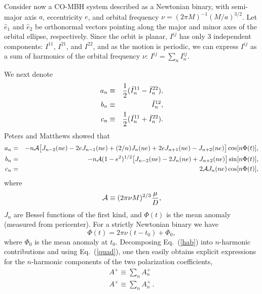 \documentclass[11pt]{report}
\newcommand {\ban} {\begin{eqnarray}}
\newcommand {\ean} {\end{eqnarray}}
\begin{document}
Consider now a CO-MBH system described as a Newtonian binary, with semi-major
axis $a$, eccentricity $e$, and orbital frequency $\nu = (2\pi M)^{-1}
(M/a)^{3/2}$.
Let ${\hat e_1}$ and ${\hat e_2}$ be orthonormal vectors pointing
along the major and minor axes of the orbital ellipse, respectively.
Since the orbit is planar, $I^{ij}$ has only 3 independent components:
$I^{11}$, $I^{21}$, and $I^{22}$,
and as the motion is periodic, we can express $I^{ij}$ as a sum of harmonics
of the orbital frequency $\nu$:
$I^{ij}=\sum_n I^{ij}_n$.

We next denote
\ban
a_n &\equiv& {1\over 2}(\ddot I^{11}_n - \ddot I^{22}_n), \nonumber\\
b_n &\equiv& \ddot I^{12}_n, \nonumber\\
c_n &\equiv& {1\over 2}(\ddot I^{11}_n + \ddot I^{22}_n). \label{anbncn}
\ean
Peters and Matthews showed \cite{pm} that
\begin{eqnarray} \label{abc}
a_n &=& - n{\cal A}\bigl[J_{n-2}(ne)-2eJ_{n-1}(ne)+(2/n)J_n(ne)
+2eJ_{n+1}(ne)-J_{n+2}(ne)\bigr]\cos[n\Phi(t)],
\nonumber\\
b_n &=& - n{\cal A}(1-e^2)^{1/2}\bigl[J_{n-2}(ne)-2J_{n}(ne)
+J_{n+2}(ne)\bigr]\sin[n \Phi(t)],
\nonumber\\
c_n &=& 2{\cal A}J_n(ne)\cos[n\Phi(t)],
\end{eqnarray}
where
\begin{equation} \label{calA}
{\cal A}\equiv (2\pi \nu M)^{2/3}\frac{\mu}{D} ,
\end{equation}
$J_n$ are Bessel functions of the first kind,
and $\Phi(t)$ is the mean anomaly (measured from pericenter).
For a strictly Newtonian binary we have
\begin{equation} \label{Phi}
\Phi(t) = 2\pi\nu (t-t_0) +\Phi_0,
\end{equation}
where $\Phi_0$ is the mean anomaly at $t_0$.
Decomposing Eq.\ (\ref{hab}) into $n$-harmonic contributions and
using Eq.~(\ref{quad}), one then easily obtains explicit expressions
for the $n$-harmonic components of the two polarization
coefficients, 
\begin{eqnarray}\label{harmonics}
A^{+}\equiv \sum_n A^{+}_n \\
A^{\times}\equiv \sum_n A^{\times}_n \, . \\
\end{eqnarray}
\end{document}
